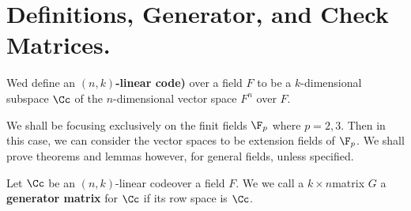 
\section{Definitions, Generator, and Check Matrices.}
\label{section1}

\begin{definition}
    Wed define an  \textbf{$(n,k)$-linear code)} over a field $F$ to be a
    $k$-dimensional subspace $\Cc$ of the  $n$-dimensional vector space  $F^n$
    over  $F$.
\end{definition}
\begin{remark}
    We shall be focusing exclusively on the finit fields $\F_p$ where  $p=2,3$.
    Then in this case, we can consider the vector spaces to be extension fields
    of  $\F_p$. We shall prove theorems and lemmas however, for general fields,
    unless specified.
\end{remark}

\begin{definition}
    Let $\Cc$ be an  $(n,k)$-linear codeover a field $F$. We we call a $k \times
    n$matrix $G$ a  \textbf{generator matrix} for $\Cc$ if its row space is $\Cc$.
\end{definition}

